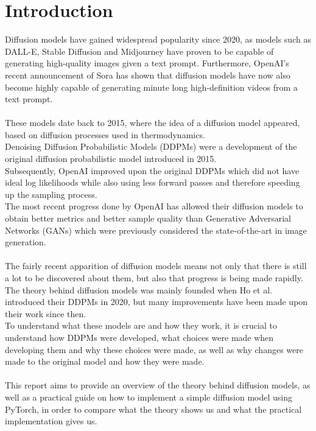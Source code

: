 \documentclass[twoside]{article}
\numberwithin{equation}{section}
\numberwithin{figure}{section}
\begin{document}
\newpage
\tableofcontents



\newpage
\section{Introduction}

Diffusion models have gained widespread popularity since 2020, as models such as DALL-E, Stable Diffusion \cite{stablediffusion,rombach2022highresolution} and Midjourney have proven to be capable of generating high-quality images given a text prompt. Furthermore, OpenAI's recent announcement of Sora has shown that diffusion models have now also become highly capable of generating minute long high-definition videos from a text prompt. \cite{videoworldsimulators2024}
\\\\
These models date back to 2015, where the idea of a diffusion model appeared, based on diffusion processes used in thermodynamics. \cite{sohldickstein2015deep} \\
Denoising Diffusion Probabilistic Models (DDPMs) were a development of the original diffusion probabilistic model introduced in 2015. \cite{ho2020denoising} \\
Subsequently, OpenAI improved upon the original DDPMs which did not have ideal log likelihoods \cite{ho2020denoising} while also using less forward passes and therefore speeding up the sampling process. \cite{nichol2021improved} \\
The most recent progress done by OpenAI has allowed their diffusion models to obtain better metrics and better sample quality than Generative Adversarial Networks (GANs) which were previously considered the state-of-the-art in image generation. \cite{dhariwal2021diffusion}
\\\\
The fairly recent apparition of diffusion models means not only that there is still a lot to be discovered about them, but also that progress is being made rapidly. \\
The theory behind diffusion models was mainly founded when Ho et al. \cite{ho2020denoising} introduced their DDPMs in 2020, but many improvements have been made upon their work since then. \\ 
To understand what these models are and how they work, it is crucial to understand how DDPMs were developed, what choices were made when developing them and why these choices were made, as well as why changes were made to the original model and how they were made.
\\\\
This report aims to provide an overview of the theory behind diffusion models, as well as a practical guide on how to implement a simple diffusion model using PyTorch, in order to compare what the theory shows us and what the practical implementation gives us.
\end{document}
